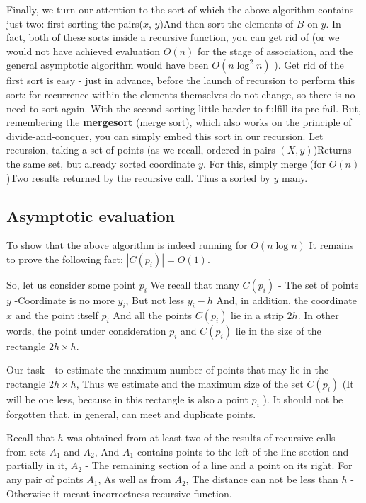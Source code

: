 Finally, we turn our attention to the sort of which the above algorithm contains just two: first sorting the pairs($x$, $y$)And then sort the elements of $B$ on $y$. In fact, both of these sorts inside a recursive function, you can get rid of (or we would not have achieved evaluation $O (n)$ for the stage of association, and the general asymptotic algorithm would have been $O (n \log ^ 2 n)$ ). Get rid of the first sort is easy - just in advance, before the launch of recursion to perform this sort: for recurrence within the elements themselves do not change, so there is no need to sort again. With the second sorting little harder to fulfill its pre-fail. But, remembering the \textbf{mergesort} (merge sort), which also works on the principle of divide-and-conquer, you can simply embed this sort in our recursion. Let recursion, taking a set of points (as we recall, ordered in pairs $(X, y)$)Returns the same set, but already sorted coordinate $y$. For this, simply merge (for $O (n)$)Two results returned by the recursive call. Thus a sorted by $y$ many.

\subsection{ Asymptotic evaluation }

To show that the above algorithm is indeed running for $O (n \log n)$ It remains to prove the following fact: $| C (p_i) | = O (1)$.

So, let us consider some point $p_i$ We recall that many $C (p_i)$ - The set of points $y$ -Coordinate is no more $y_i$, But not less $y_i-h$ And, in addition, the coordinate $x$ and the point itself $p_i$ And all the points $C (p_i)$ lie in a strip $2h$. In other words, the point under consideration $p_i$ and $C (p_i)$ lie in the size of the rectangle $2h \times h$.

Our task - to estimate the maximum number of points that may lie in the rectangle $2h \times h$, Thus we estimate and the maximum size of the set $C (p_i)$ (It will be one less, because in this rectangle is also a point $p_i$ ). It should not be forgotten that, in general, can meet and duplicate points.

Recall that $h$ was obtained from at least two of the results of recursive calls - from sets $A_1$ and $A_2$, And $A_1$ contains points to the left of the line section and partially in it, $A_2$ - The remaining section of a line and a point on its right. For any pair of points $A_1$, As well as from $A_2$, The distance can not be less than $h$ - Otherwise it meant incorrectness recursive function.

